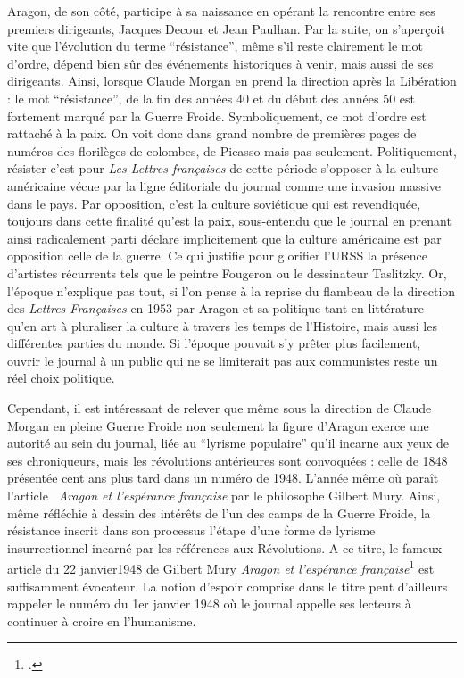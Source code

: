 	Aragon, de son côté, participe à sa naissance en opérant la rencontre entre ses premiers dirigeants, Jacques Decour et Jean Paulhan. Par la suite, on s’aperçoit vite que l’évolution du terme \enquote{résistance}, même s’il reste clairement le mot d’ordre, dépend bien sûr des événements historiques à venir, mais aussi de ses dirigeants. Ainsi, lorsque Claude Morgan en prend la direction après la Libération : le mot \enquote{résistance}, de la fin des années 40 et du début des années 50 est  fortement marqué par la Guerre Froide. Symboliquement, ce mot d’ordre est rattaché à la paix. On voit donc dans grand nombre de premières pages de numéros des florilèges de colombes, de Picasso mais pas seulement. Politiquement, résister c’est pour \emph{Les Lettres françaises} de cette période s’opposer à la culture américaine vécue par la ligne éditoriale du journal comme une invasion massive dans le pays. Par opposition, c’est la culture soviétique qui est revendiquée, toujours dans cette finalité qu’est la paix, sous-entendu que le journal en prenant ainsi radicalement parti déclare implicitement que la culture américaine est par opposition celle de la guerre. Ce qui justifie pour glorifier l’URSS la présence d’artistes récurrents tels que le peintre Fougeron ou le dessinateur Taslitzky. Or, l’époque n’explique pas tout, si l’on pense à la reprise du flambeau de la direction des \emph{Lettres Françaises} en 1953 par Aragon et sa politique tant en littérature qu’en art à pluraliser la culture à travers les temps de l’Histoire, mais aussi les différentes parties du monde. Si l’époque pouvait s’y prêter plus facilement, ouvrir le journal à un public qui ne se limiterait pas aux communistes reste un réel choix politique. 


Cependant, il est intéressant de relever que même sous la direction de Claude Morgan en pleine Guerre Froide non seulement la figure d’Aragon exerce une autorité au sein du journal, liée au \enquote{lyrisme populaire} qu’il incarne aux yeux de ses chroniqueurs, mais les révolutions antérieures sont convoquées : celle de 1848 présentée  cent ans plus tard dans un numéro de 1948. L’année même où paraît l’article  \emph{Aragon et l’espérance française} par le philosophe Gilbert Mury. Ainsi, même réfléchie à dessin des intérêts de l’un des camps de la Guerre Froide, la résistance inscrit dans son processus l’étape d’une forme de lyrisme insurrectionnel incarné par les références aux Révolutions. A ce titre, le fameux article du 22 janvier1948 de Gilbert Mury \emph{Aragon et l’espérance française}\footcite{avantgarde} est suffisamment évocateur. La notion d’espoir comprise dans le titre peut d’ailleurs rappeler le numéro du 1er janvier 1948 où le journal appelle ses lecteurs à continuer à croire en l’humanisme. 


